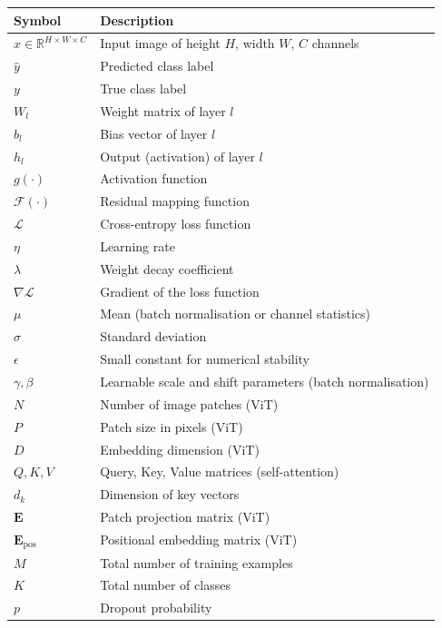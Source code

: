 \documentclass[12pt, letterpaper]{article}
\begin{document}
\begin{tabular}{@{}L{3.5cm} L{9.5cm}@{}}
    \toprule
    \textbf{Symbol} & \textbf{Description} \\
    \midrule
    $x \in \mathbb{R}^{H \times W \times C}$ & Input image of height $H$, width $W$, $C$ channels \\
    $\hat{y}$           & Predicted class label \\
    $y$                 & True class label \\
    $W_l$               & Weight matrix of layer $l$ \\
    $b_l$               & Bias vector of layer $l$ \\
    $h_l$               & Output (activation) of layer $l$ \\
    $g(\cdot)$          & Activation function \\
    $\mathcal{F}(\cdot)$& Residual mapping function \\
    $\mathcal{L}$       & Cross-entropy loss function \\
    $\eta$              & Learning rate \\
    $\lambda$           & Weight decay coefficient \\
    $\nabla \mathcal{L}$& Gradient of the loss function \\
    $\mu$               & Mean (batch normalisation or channel statistics) \\
    $\sigma$            & Standard deviation \\
    $\epsilon$          & Small constant for numerical stability \\
    $\gamma, \beta$     & Learnable scale and shift parameters (batch normalisation) \\
    $N$                 & Number of image patches (ViT) \\
    $P$                 & Patch size in pixels (ViT) \\
    $D$                 & Embedding dimension (ViT) \\
    $Q, K, V$           & Query, Key, Value matrices (self-attention) \\
    $d_k$               & Dimension of key vectors \\
    $\mathbf{E}$        & Patch projection matrix (ViT) \\
    $\mathbf{E}_{\text{pos}}$ & Positional embedding matrix (ViT) \\
    $M$                 & Total number of training examples \\
    $K$                 & Total number of classes \\
    $p$                 & Dropout probability \\
    \bottomrule
\end{tabular}
\end{document}

